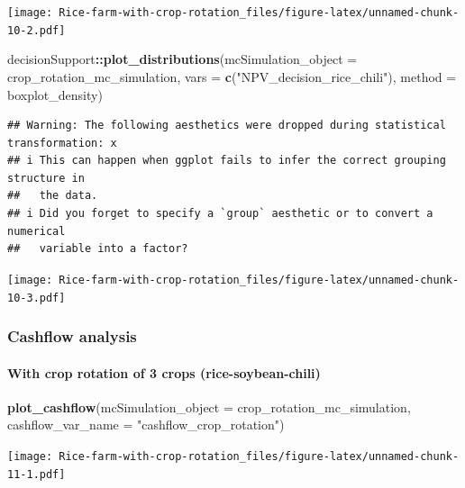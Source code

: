 \documentclass[
]{article}
\newenvironment{Shaded}{\begin{snugshade}}{\end{snugshade}}
\newcommand{\AttributeTok}[1]{\textcolor[rgb]{0.13,0.29,0.53}{#1}}
\newcommand{\FunctionTok}[1]{\textcolor[rgb]{0.13,0.29,0.53}{\textbf{#1}}}
\newcommand{\NormalTok}[1]{#1}
\newcommand{\SpecialCharTok}[1]{\textcolor[rgb]{0.81,0.36,0.00}{\textbf{#1}}}
\newcommand{\StringTok}[1]{\textcolor[rgb]{0.31,0.60,0.02}{#1}}
\begin{document}
\texttt{[image: Rice-farm-with-crop-rotation\_files/figure-latex/unnamed-chunk-10-2.pdf]}

\begin{Shaded}
\begin{Highlighting}[]
\NormalTok{decisionSupport}\SpecialCharTok{::}\FunctionTok{plot\_distributions}\NormalTok{(}\AttributeTok{mcSimulation\_object =}\NormalTok{ crop\_rotation\_mc\_simulation, }
                                    \AttributeTok{vars =} \FunctionTok{c}\NormalTok{(}\StringTok{"NPV\_decision\_rice\_chili"}\NormalTok{),}
                                    \AttributeTok{method =} \StringTok{\textquotesingle{}boxplot\_density\textquotesingle{}}\NormalTok{)}
\end{Highlighting}
\end{Shaded}

\begin{verbatim}
## Warning: The following aesthetics were dropped during statistical transformation: x
## i This can happen when ggplot fails to infer the correct grouping structure in
##   the data.
## i Did you forget to specify a `group` aesthetic or to convert a numerical
##   variable into a factor?
\end{verbatim}

\texttt{[image: Rice-farm-with-crop-rotation\_files/figure-latex/unnamed-chunk-10-3.pdf]}

\hypertarget{cashflow-analysis}{%
\subsubsection{Cashflow analysis}\label{cashflow-analysis}}

\hypertarget{with-crop-rotation-of-3-crops-rice-soybean-chili}{%
\paragraph{With crop rotation of 3 crops
(rice-soybean-chili)}\label{with-crop-rotation-of-3-crops-rice-soybean-chili}}

\begin{Shaded}
\begin{Highlighting}[]
\FunctionTok{plot\_cashflow}\NormalTok{(}\AttributeTok{mcSimulation\_object =}\NormalTok{ crop\_rotation\_mc\_simulation, }\AttributeTok{cashflow\_var\_name =} \StringTok{"cashflow\_crop\_rotation"}\NormalTok{)}
\end{Highlighting}
\end{Shaded}

\texttt{[image: Rice-farm-with-crop-rotation\_files/figure-latex/unnamed-chunk-11-1.pdf]}
\end{document}
